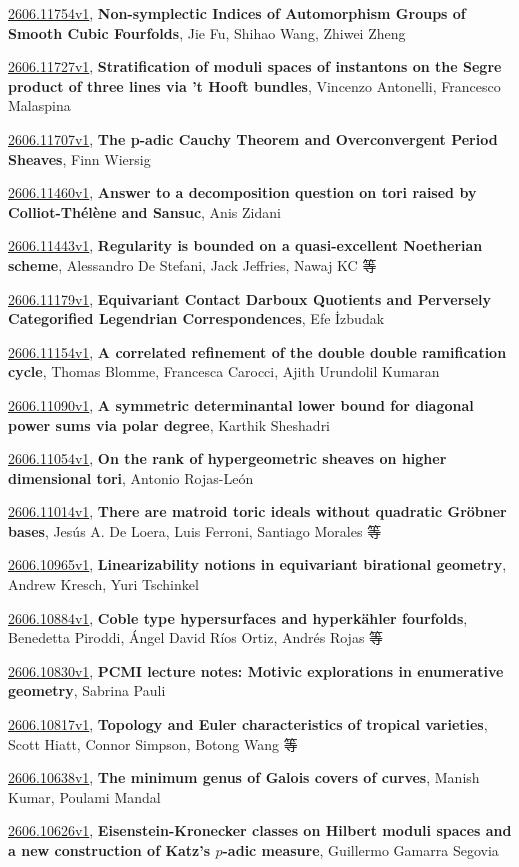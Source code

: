 \documentclass[9pt, a4paper]{article}
\theoremstyle{plain}
\theoremstyle{definition}
\theoremstyle{remark}
\newcommand{\arxiv}[3]{\href{https://arxiv.org/abs/#1}{#1}, \textbf{\textcolor{arxivblue}{#2}}, #3}
\begin{document}
\arxiv{2606.11754v1}{Non-symplectic Indices of Automorphism Groups of Smooth Cubic Fourfolds}{Jie Fu, Shihao Wang, Zhiwei Zheng}

\arxiv{2606.11727v1}{Stratification of moduli spaces of instantons on the Segre product of three lines via 't Hooft bundles}{Vincenzo Antonelli, Francesco Malaspina}

\arxiv{2606.11707v1}{The p-adic Cauchy Theorem and Overconvergent Period Sheaves}{Finn Wiersig}

\arxiv{2606.11460v1}{Answer to a decomposition question on tori raised by Colliot-Thélène and Sansuc}{Anis Zidani}

\arxiv{2606.11443v1}{Regularity is bounded on a quasi-excellent Noetherian scheme}{Alessandro De Stefani, Jack Jeffries, Nawaj KC 等}

\arxiv{2606.11179v1}{Equivariant Contact Darboux Quotients and Perversely Categorified Legendrian Correspondences}{Efe İzbudak}

\arxiv{2606.11154v1}{A correlated refinement of the double double ramification cycle}{Thomas Blomme, Francesca Carocci, Ajith Urundolil Kumaran}

\arxiv{2606.11090v1}{A symmetric determinantal lower bound for diagonal power sums via polar degree}{Karthik Sheshadri}

\arxiv{2606.11054v1}{On the rank of hypergeometric sheaves on higher dimensional tori}{Antonio Rojas-León}

\arxiv{2606.11014v1}{There are matroid toric ideals without quadratic Gröbner bases}{Jesús A. De Loera, Luis Ferroni, Santiago Morales 等}

\arxiv{2606.10965v1}{Linearizability notions in equivariant birational geometry}{Andrew Kresch, Yuri Tschinkel}

\arxiv{2606.10884v1}{Coble type hypersurfaces and hyperkähler fourfolds}{Benedetta Piroddi, Ángel David Ríos Ortiz, Andrés Rojas 等}

\arxiv{2606.10830v1}{PCMI lecture notes: Motivic explorations in enumerative geometry}{Sabrina Pauli}

\arxiv{2606.10817v1}{Topology and Euler characteristics of tropical varieties}{Scott Hiatt, Connor Simpson, Botong Wang 等}

\arxiv{2606.10638v1}{The minimum genus of Galois covers of curves}{Manish Kumar, Poulami Mandal}

\arxiv{2606.10626v1}{Eisenstein-Kronecker classes on Hilbert moduli spaces and a new construction of Katz's $p$-adic measure}{Guillermo Gamarra Segovia}
\end{document}
